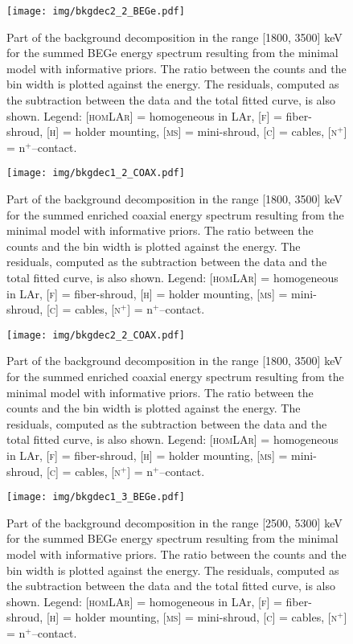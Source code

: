 \begin{landscape}
\begin{figure}
	\end{figure}
	\begin{figure}
		\centering
		\texttt{[image: img/bkgdec2\_2\_BEGe.pdf]}
		\caption{Part of the background decomposition in the range [1800, 3500] keV for the summed BEGe energy spectrum resulting from the minimal model with informative priors. The ratio between the counts and the bin width is plotted against the energy. The residuals, computed as the subtraction between the data and the total fitted curve, is also shown. Legend: \textsc{[homLAr]} = homogeneous in LAr, \textsc{[f]} = fiber-shroud, \textsc{[h]} = holder mounting, \textsc{[ms]} = mini-shroud, \textsc{[c]} = cables, \textsc{[n$^+$]} = n$^+$--contact.}
	\end{figure}
	\begin{figure}
		\centering
		\texttt{[image: img/bkgdec1\_2\_COAX.pdf]}
		\caption{Part of the background decomposition in the range [1800, 3500] keV for the summed enriched coaxial energy spectrum resulting from the minimal model with informative priors. The ratio between the counts and the bin width is plotted against the energy. The residuals, computed as the subtraction between the data and the total fitted curve, is also shown. Legend: \textsc{[homLAr]} = homogeneous in LAr, \textsc{[f]} = fiber-shroud, \textsc{[h]} = holder mounting, \textsc{[ms]} = mini-shroud, \textsc{[c]} = cables, \textsc{[n$^+$]} = n$^+$--contact.}
	\end{figure}
	\begin{figure}
		\centering
		\texttt{[image: img/bkgdec2\_2\_COAX.pdf]}
		\caption{Part of the background decomposition in the range [1800, 3500] keV for the summed enriched coaxial energy spectrum resulting from the minimal model with informative priors. The ratio between the counts and the bin width is plotted against the energy. The residuals, computed as the subtraction between the data and the total fitted curve, is also shown. Legend: \textsc{[homLAr]} = homogeneous in LAr, \textsc{[f]} = fiber-shroud, \textsc{[h]} = holder mounting, \textsc{[ms]} = mini-shroud, \textsc{[c]} = cables, \textsc{[n$^+$]} = n$^+$--contact.}
	\end{figure}
	\begin{figure}
		\centering
		\texttt{[image: img/bkgdec1\_3\_BEGe.pdf]}
		\caption{Part of the background decomposition in the range [2500, 5300] keV for the summed BEGe energy spectrum resulting from the minimal model with informative priors. The ratio between the counts and the bin width is plotted against the energy. The residuals, computed as the subtraction between the data and the total fitted curve, is also shown. Legend: \textsc{[homLAr]} = homogeneous in LAr, \textsc{[f]} = fiber-shroud, \textsc{[h]} = holder mounting, \textsc{[ms]} = mini-shroud, \textsc{[c]} = cables, \textsc{[n$^+$]} = n$^+$--contact.}

\end{figure}
\end{landscape}
